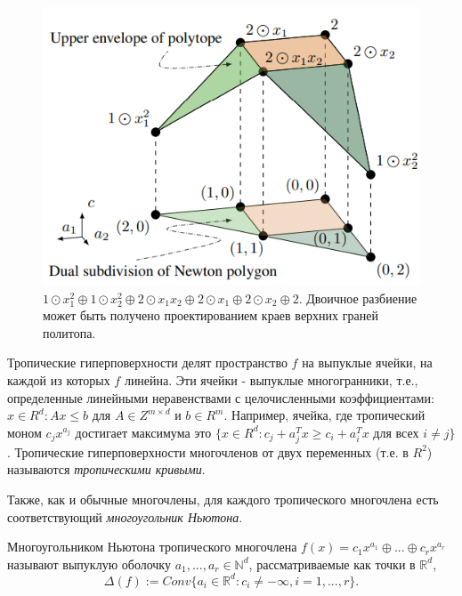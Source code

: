 \documentclass[russian]{lecture-notes}
\begin{document}
	\begin{figure}[h]
		\centering
		\includegraphics{dual_subdivision.png}
		\caption{$1 \odot x_1^2 \oplus 1 \odot x_2^2 \oplus 2 \odot x_1x_2 \oplus 2 \odot x_1 \oplus 2 \odot x_2 \oplus 2.$ Двоичное разбиение может быть получено проектированием краев верхних граней политопа.}
	\end{figure}

	Тропические гиперповерхности делят пространство $f$ на выпуклые ячейки, на каждой из которых $f$ линейна. Эти ячейки - выпуклые многогранники, т.е., определенные линейными неравенствами с целочисленными коэффициентами: ${x \in R^d : Ax \leq b}$ для $ A \in Z^{m \times d}$ и $b \in R^m$. Например, ячейка, где тропический моном $c_jx^{a_j}$ достигает максимума это $\{x \in R^d : c_j + a_j^Tx \geq c_i + a_i^Tx$ для всех $ i \neq j\}$. Тропические гиперповерхности многочленов от двух переменных (т.е. в $R^2$) называются \textit{тропическими кривыми}.
	
	Также, как и обычные многочлены, для каждого тропического многочлена есть соответствующий \textit{многоугольник Ньютона}.
	
	\begin{Definition}
		Многоугольником Ньютона тропического многочлена $f(x) = c_1x^{a_1} \oplus ... \oplus c_r x^{a_r}$ называют выпуклую оболочку $a_1, ..., a_r \in \mathbb{N}^d$, рассматриваемые как точки в $\mathbb{R}^d$,
		\begin{equation*}
			\Delta(f) := Conv\{a_i \in \mathbb{R}^d : c_i \neq - \infty, i=1,...,r\}.
		\end{equation*}
	\end{Definition}
\end{document}
